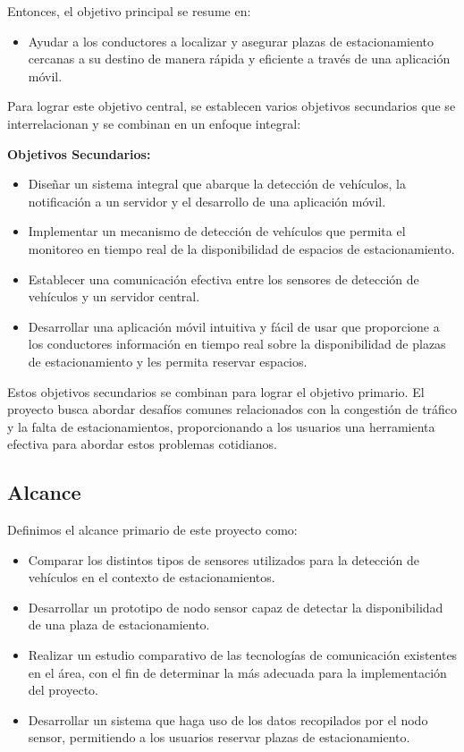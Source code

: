 Entonces, el objetivo principal se resume en:

\begin{itemize}
    \item Ayudar a los conductores a localizar y asegurar plazas de estacionamiento cercanas a su destino de manera rápida y eficiente a través de una aplicación móvil.
\end{itemize}

Para lograr este objetivo central, se establecen varios objetivos secundarios que se interrelacionan y se combinan en un enfoque integral:

\textbf{Objetivos Secundarios:}
\begin{itemize}
    \item Diseñar un sistema integral que abarque la detección de vehículos, la notificación a un servidor y el desarrollo de una aplicación móvil.
    \item Implementar un mecanismo de detección de vehículos que permita el monitoreo en tiempo real de la disponibilidad de espacios de estacionamiento.
    \item Establecer una comunicación efectiva entre los sensores de detección de vehículos y un servidor central.
    \item Desarrollar una aplicación móvil intuitiva y fácil de usar que proporcione a los conductores información en tiempo real sobre la disponibilidad de plazas de estacionamiento y les permita reservar espacios.
\end{itemize}

Estos objetivos secundarios se combinan para lograr el objetivo primario. El proyecto busca abordar desafíos comunes relacionados con la congestión de tráfico y la falta de estacionamientos, proporcionando a los usuarios una herramienta efectiva para abordar estos problemas cotidianos.


\subsection{Alcance}
Definimos el alcance primario de este proyecto como: 
\begin{itemize}
    \item Comparar los distintos tipos de sensores utilizados para la detección de vehículos en el contexto de estacionamientos.
    \item Desarrollar un prototipo de nodo sensor capaz de detectar la disponibilidad de una plaza de estacionamiento.
    \item Realizar un estudio comparativo de las tecnologías de comunicación existentes en el área, con el fin de determinar la más adecuada para la implementación del proyecto.
    \item Desarrollar un sistema que haga uso de los datos recopilados por el nodo sensor, permitiendo a los usuarios reservar plazas de estacionamiento.
\end{itemize}


